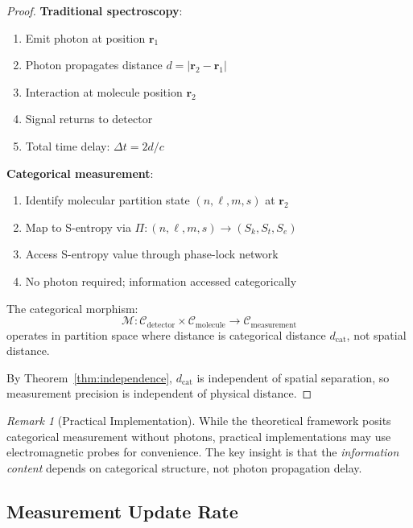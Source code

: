 \documentclass[twocolumn,10pt,a4paper]{article}
\theoremstyle{definition}
\theoremstyle{remark}
\newtheorem{remark}[theorem]{Remark}
\newcommand{\dcat}{d_{\mathrm{cat}}}
\begin{document}
\begin{proof}
\textbf{Traditional spectroscopy}:
\begin{enumerate}
    \item Emit photon at position $\mathbf{r}_1$
    \item Photon propagates distance $d = |\mathbf{r}_2 - \mathbf{r}_1|$
    \item Interaction at molecule position $\mathbf{r}_2$
    \item Signal returns to detector
    \item Total time delay: $\Delta t = 2d/c$
\end{enumerate}

\textbf{Categorical measurement}:
\begin{enumerate}
    \item Identify molecular partition state $(n, \ell, m, s)$ at $\mathbf{r}_2$
    \item Map to S-entropy via $\Pi: (n,\ell,m,s) \to (S_k, S_t, S_e)$
    \item Access S-entropy value through phase-lock network
    \item No photon required; information accessed categorically
\end{enumerate}

The categorical morphism:
\begin{equation}
    \mathcal{M}: \mathcal{C}_{\text{detector}} \times \mathcal{C}_{\text{molecule}} \to \mathcal{C}_{\text{measurement}}
\end{equation}
operates in partition space where distance is categorical distance $\dcat$, not spatial distance.

By Theorem~\ref{thm:independence}, $\dcat$ is independent of spatial separation, so measurement precision is independent of physical distance.
\end{proof}

\begin{remark}[Practical Implementation]
While the theoretical framework posits categorical measurement without photons, practical implementations may use electromagnetic probes for convenience. The key insight is that the \textit{information content} depends on categorical structure, not photon propagation delay.
\end{remark}

\subsection{Measurement Update Rate}
\end{document}
